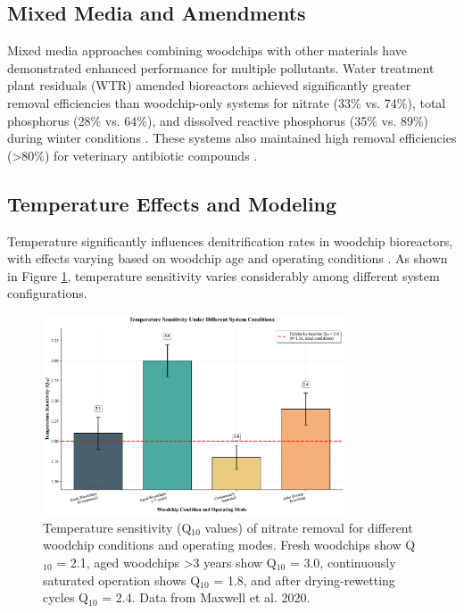 \documentclass[12pt,a4paper]{article}
\begin{document}
\subsection{Mixed Media and Amendments}

Mixed media approaches combining woodchips with other materials have demonstrated enhanced performance for multiple pollutants. Water treatment plant residuals (WTR) amended bioreactors achieved significantly greater removal efficiencies than woodchip-only systems for nitrate (33\% vs. 74\%), total phosphorus (28\% vs. 64\%), and dissolved reactive phosphorus (35\% vs. 89\%) during winter conditions \citep{RN282}. These systems also maintained high removal efficiencies (>80\%) for veterinary antibiotic compounds \citep{RN282}.

\subsection{Temperature Effects and Modeling}

Temperature significantly influences denitrification rates in woodchip bioreactors, with effects varying based on woodchip age and operating conditions \citep{RN228, RN242}. As shown in Figure \ref{fig:temperature_sensitivity}, temperature sensitivity varies considerably among different system configurations.

\begin{figure}[ht]
\centering
\includegraphics[width=0.8\textwidth]{fig4_temperature_scientific}
\caption{Temperature sensitivity (Q$_{10}$ values) of nitrate removal for different woodchip conditions and operating modes. Fresh woodchips show Q$_{10}$ = 2.1, aged woodchips >3 years show Q$_{10}$ = 3.0, continuously saturated operation shows Q$_{10}$ = 1.8, and after drying-rewetting cycles Q$_{10}$ = 2.4. Data from Maxwell et al. 2020.}
\label{fig:temperature_sensitivity}
\end{figure}
\end{document}
